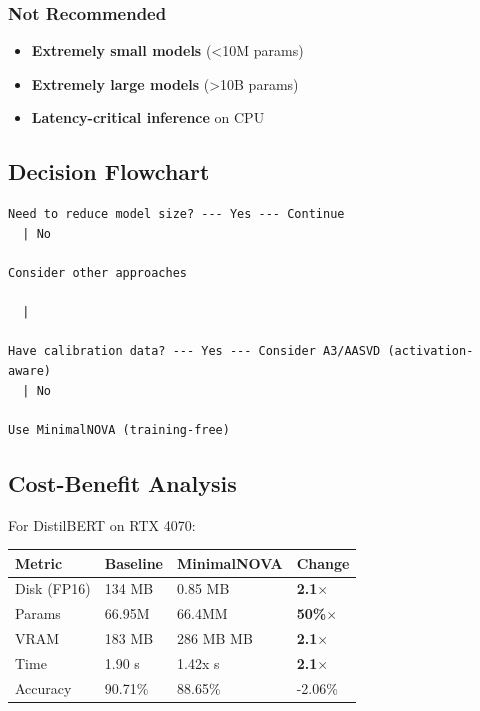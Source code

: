 \subsubsection{Not Recommended}

\begin{itemize}
\item \textbf{Extremely small models} (\textless{}10M params)
\item \textbf{Extremely large models} (\textgreater{}10B params)
\item \textbf{Latency-critical inference} on CPU

\end{itemize}
\subsection{Decision Flowchart}

\begin{lstlisting}
Need to reduce model size? --- Yes --- Continue
  | No
   
Consider other approaches

  |
   
Have calibration data? --- Yes --- Consider A3/AASVD (activation-aware)
  | No
   
Use MinimalNOVA (training-free)
\end{lstlisting}

\subsection{Cost-Benefit Analysis}

For DistilBERT on RTX 4070:

\begin{table}[H]
\centering
\small
\begin{tabular}{llll}
\toprule
\textbf{Metric} & \textbf{Baseline} & \textbf{MinimalNOVA} & \textbf{Change} \\
\midrule
Disk (FP16) & 134 MB & 0.85 MB & \textbf{2.1$\times$} \\
Params & 66.95M & 66.4MM & \textbf{50\%$\times$} \\
VRAM & 183 MB & 286 MB MB & \textbf{2.1$\times$} \\
Time & 1.90 s & 1.42x s & \textbf{2.1$\times$} \\
Accuracy & 90.71\% & 88.65\% & -2.06\% \\
\bottomrule
\end{tabular}
\end{table}

